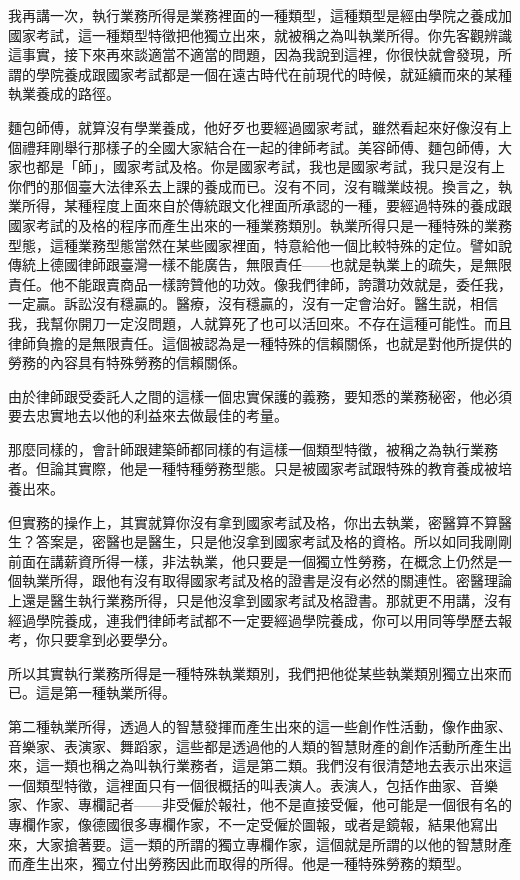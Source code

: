 \documentclass[oneside,sub3section]{ctexbook}
\begin{document}
我再講一次，執行業務所得是業務裡面的一種類型，這種類型是經由學院之養成加國家考試，這一種類型特徵把他獨立出來，就被稱之為叫執業所得。你先客觀辨識這事實，接下來再來談適當不適當的問題，因為我說到這裡，你很快就會發現，所謂的學院養成跟國家考試都是一個在遠古時代在前現代的時候，就延續而來的某種執業養成的路徑。

麵包師傅，就算沒有學業養成，他好歹也要經過國家考試，雖然看起來好像沒有上個禮拜剛舉行那樣子的全國大家結合在一起的律師考試。美容師傅、麵包師傅，大家也都是「師」，國家考試及格。你是國家考試，我也是國家考試，我只是沒有上你們的那個臺大法律系去上課的養成而已。沒有不同，沒有職業歧視。換言之，執業所得，某種程度上面來自於傳統跟文化裡面所承認的一種，要經過特殊的養成跟國家考試的及格的程序而產生出來的一種業務類別。執業所得只是一種特殊的業務型態，這種業務型態當然在某些國家裡面，特意給他一個比較特殊的定位。譬如說傳統上德國律師跟臺灣一樣不能廣告，無限責任------也就是執業上的疏失，是無限責任。他不能跟賣商品一樣誇贊他的功效。像我們律師，誇讚功效就是，委任我，一定贏。訴訟沒有穩贏的。醫療，沒有穩贏的，沒有一定會治好。醫生説，相信我，我幫你開刀一定沒問題，人就算死了也可以活回來。不存在這種可能性。而且律師負擔的是無限責任。這個被認為是一種特殊的信賴關係，也就是對他所提供的勞務的內容具有特殊勞務的信賴關係。

由於律師跟受委託人之間的這樣一個忠實保護的義務，要知悉的業務秘密，他必須要去忠實地去以他的利益來去做最佳的考量。

那麼同樣的，會計師跟建築師都同樣的有這樣一個類型特徵，被稱之為執行業務者。但論其實際，他是一種特種勞務型態。只是被國家考試跟特殊的教育養成被培養出來。

但實務的操作上，其實就算你沒有拿到國家考試及格，你出去執業，密醫算不算醫生？答案是，密醫也是醫生，只是他沒拿到國家考試及格的資格。所以如同我剛剛前面在講薪資所得一樣，非法執業，他只要是一個獨立性勞務，在概念上仍然是一個執業所得，跟他有沒有取得國家考試及格的證書是沒有必然的關連性。密醫理論上還是醫生執行業務所得，只是他沒拿到國家考試及格證書。那就更不用講，沒有經過學院養成，連我們律師考試都不一定要經過學院養成，你可以用同等學歷去報考，你只要拿到必要學分。

所以其實執行業務所得是一種特殊執業類別，我們把他從某些執業類別獨立出來而已。這是第一種執業所得。

第二種執業所得，透過人的智慧發揮而產生出來的這一些創作性活動，像作曲家、音樂家、表演家、舞蹈家，這些都是透過他的人類的智慧財產的創作活動所產生出來，這一類也稱之為叫執行業務者，這是第二類。我們沒有很清楚地去表示出來這一個類型特徵，這裡面只有一個很概括的叫表演人。表演人，包括作曲家、音樂家、作家、專欄記者------非受僱於報社，他不是直接受僱，他可能是一個很有名的專欄作家，像德國很多專欄作家，不一定受僱於圖報，或者是鏡報，結果他寫出來，大家搶著要。這一類的所謂的獨立專欄作家，這個就是所謂的以他的智慧財產而產生出來，獨立付出勞務因此而取得的所得。他是一種特殊勞務的類型。
\end{document}
